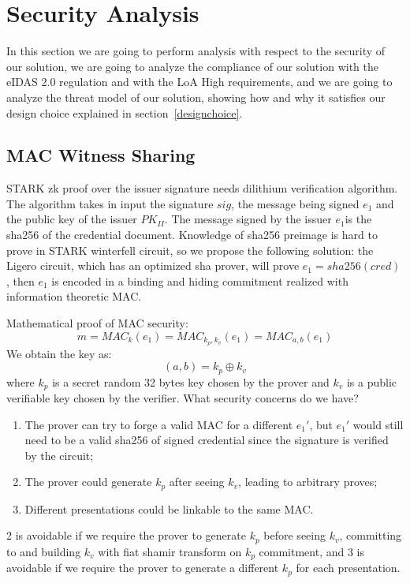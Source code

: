 \documentclass[binding=0.6cm,oneside,noexaminfo]{sapthesis}
\begin{document}
\section{Security Analysis}
\label{analysis}
In this section we are going to perform analysis with respect to the security of our solution, we are going to analyze
the compliance of our solution with the eIDAS 2.0 regulation and with the LoA High requirements, and we are going to analyze 
the threat model of our solution, showing how and why it satisfies our design choice explained in section~\ref{designchoice}.

\subsection{MAC Witness Sharing}
\label{securityanalysis}
STARK zk proof over the issuer signature needs dilithium verification algorithm.
The algorithm takes in input the signature $sig$, the message being signed $e_1$ and 
the public key of the issuer $PK_{II}$.
The message signed by the issuer $e_1$is the sha256 of the credential document. Knowledge
of sha256 preimage is hard to prove in STARK winterfell circuit, so we propose the
following solution: the Ligero circuit, which has an optimized sha prover, will
prove $e_1 = sha256(cred)$, then $e_1$ is encoded in a binding and hiding commitment
realized with information theoretic MAC.

Mathematical proof of MAC security:$$m = MAC_k(e_1) = MAC_{k_p,k_v}(e_1) = MAC_{a,b}(e_1)$$
We obtain the key as:$$(a,b) = k_p \oplus k_v$$ where $k_p$ is a secret random 32 bytes key
chosen by the prover and $k_v$ is a public verifiable key chosen by the verifier.
What security concerns do we have?
\begin{enumerate}
    \item The prover can try to forge a valid MAC for a different $e_1'$, but $e_1'$ would
    still need to be a valid sha256 of signed credential since the signature is verified by the circuit;
    \item The prover could generate $k_p$ after seeing $k_v$, leading to arbitrary proves;
    \item Different presentations could be linkable to the same MAC.
\end{enumerate}
2 is avoidable if we require the prover to generate $k_p$ before seeing $k_v$, committing to 
and building $k_v$ with fiat shamir transform on $k_p$ commitment, and 3 is avoidable if we require the 
prover to generate a different $k_p$ for each presentation.
\end{document}
